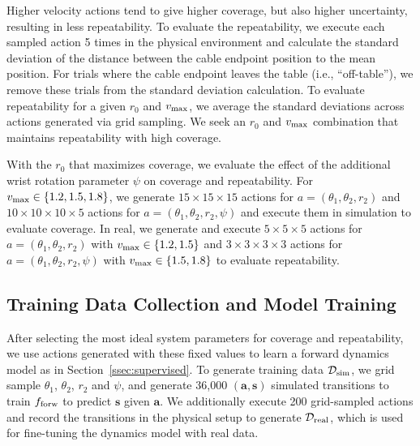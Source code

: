 \documentclass[letterpaper, 10 pt, conference]{ieeeconf}  %
\newcommand{\ba}{\mathbf{a}}
\newcommand{\bs}{\mathbf{s}}
\newcommand{\vmax}{v_{\rm max}}
\begin{document}
Higher velocity actions tend to give higher coverage, but also higher uncertainty, resulting in less repeatability. To evaluate the repeatability, we execute each sampled action 5 times in the physical environment and calculate the standard deviation of the distance between the cable endpoint position to the mean position. For trials where the cable endpoint leaves the table (i.e., ``off-table''), we remove these trials from the standard deviation calculation. To evaluate repeatability for a given $r_0$ and $\vmax$, we average the standard deviations across actions generated via grid sampling. We seek an $r_0$ and $\vmax$ combination that maintains repeatability with high coverage.
% 

With the $r_0$ that maximizes coverage, we evaluate the effect of the additional wrist rotation parameter $\psi$ on coverage and repeatability. 
For $\vmax \in \{1.2,1.5,1.8\}$, we generate $15\times15\times15$ actions for $a=(\theta_1,\theta_2,r_2)$ and $10\times10\times10\times5$ actions for $a=(\theta_1,\theta_2,r_2, \psi)$ and execute them in simulation to evaluate coverage. In real, we generate and execute $5\times5\times5$ actions for $a=(\theta_1,\theta_2,r_2)$ with $\vmax \in \{1.2,1.5\}$ and $3\times3\times3\times3$ actions for $a=(\theta_1,\theta_2,r_2, \psi)$ with $\vmax \in \{1.5,1.8\}$ to evaluate repeatability.

\subsection{Training Data Collection and Model Training}\label{ssec:data-collect}

After selecting the most ideal system parameters for coverage and repeatability, we use actions generated with these fixed values to learn a forward dynamics model as in Section~\ref{ssec:supervised}. To generate training data $\mathcal{D}_{\rm sim}$, we grid sample $\theta_1$, $\theta_2$, $r_2$ and $\psi$, and generate 36,000 $(\ba, \bs)$ simulated transitions to train $f_{\rm forw}$ to predict $\bs$ given $\ba$. We additionally execute 200 grid-sampled actions and record the transitions in the physical setup to generate $\mathcal{D}_{\rm real}$, which is used for fine-tuning the dynamics model with real data.

\end{document}
